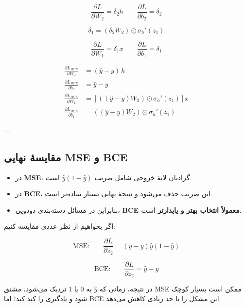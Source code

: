 \documentclass[12pt,a4paper]{article}
\begin{document}
\[
\frac{\partial L}{\partial W_2}=\delta_2 h
\qquad
\frac{\partial L}{\partial b_2}=\delta_2
\]

\[
\delta_1=(\delta_2 W_2)\odot \sigma_h'(z_1)
\]

\[
\frac{\partial L}{\partial W_1}=\delta_1 x
\qquad
\frac{\partial L}{\partial b_1}=\delta_1
\]

\begin{tcolorbox}[colback=lightblue,colframe=mainblue,title=فرم نهایی BCE]
	\[
	\boxed{
		\begin{aligned}
			\frac{\partial L_{BCE}}{\partial W_2} &= (\hat{y}-y)\,h \\
			\frac{\partial L_{BCE}}{\partial b_2} &= \hat{y}-y \\
			\frac{\partial L_{BCE}}{\partial W_1} &= \left[\left((\hat{y}-y)W_2\right)\odot \sigma_h'(z_1)\right]x \\
			\frac{\partial L_{BCE}}{\partial b_1} &= \left((\hat{y}-y)W_2\right)\odot \sigma_h'(z_1)
		\end{aligned}
	}
	\]
\end{tcolorbox}

---

\subsection{مقایسهٔ نهایی MSE و BCE}

\begin{tcolorbox}[colback=softpink,colframe=softred,title=مقایسهٔ مهم]
	\begin{itemize}
		\item در \textbf{MSE}، گرادیان لایهٔ خروجی شامل ضریب \(\hat{y}(1-\hat{y})\) است.
		\item در \textbf{BCE}، این ضریب حذف می‌شود و نتیجهٔ نهایی بسیار ساده‌تر است.
		\item بنابراین در مسائل دسته‌بندی دودویی، \textbf{BCE معمولاً انتخاب بهتر و پایدارتر} است.
	\end{itemize}
\end{tcolorbox}

اگر بخواهیم از نظر عددی مقایسه کنیم:

\[
\text{MSE:}\qquad \frac{\partial L}{\partial z_2}=(\hat{y}-y)\hat{y}(1-\hat{y})
\]

\[
\text{BCE:}\qquad \frac{\partial L}{\partial z_2}=\hat{y}-y
\]

در نتیجه، زمانی که \(\hat{y}\) به \(0\) یا \(1\) نزدیک می‌شود، مشتق MSE ممکن است بسیار کوچک شود و یادگیری را کند کند؛ اما BCE این مشکل را تا حد زیادی کاهش می‌دهد.
\end{document}
